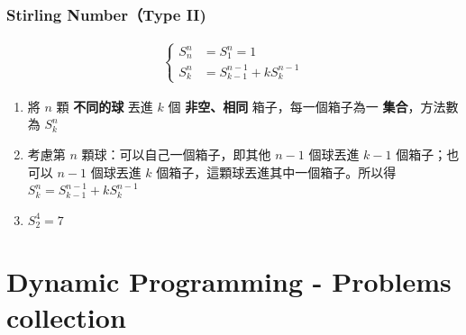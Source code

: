 \documentclass[10pt,oneside]{article}
\begin{document}
\begin{landscape}
\begin{multicols}{2}
\subsubsection{Stirling Number（Type II)}
{\normalsize
\begin{equation}
\begin{split}
\begin{cases}
	S^n_n &= S^n_1 = 1 \\
    	S^n_k &= S^{n-1}_{k-1} + k S^{n-1}_{k}
\end{cases}
\end{split}
\end{equation}

\begin{enumerate}
	\item 將 $n$ 顆 \textbf{不同的球} 丟進 $k$ 個 \textbf{非空、相同} 箱子，每一個箱子為一 \textbf{集合}，方法數為 $S^n_k$
	\item 考慮第 $n$ 顆球：可以自己一個箱子，即其他 $n-1$ 個球丟進 $k-1$ 個箱子；也可以 $n-1$ 個球丟進 $k$ 個箱子，這顆球丟進其中一個箱子。所以得 $S^n_k = S^{n-1}_{k-1} + k S^{n-1}_{k}$
	\item $S^4_2 = 7$
\end{enumerate}
}


\section{Dynamic Programming - Problems collection}

\newpage
{}

% 

\end{multicols}
\end{landscape}
\end{document}
